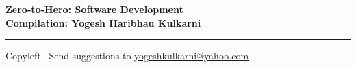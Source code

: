 
\graphicspath{{images/}}


\footnotesize


\begin{center}
\Large{\textbf{Zero-to-Hero: Software Development\\ Compilation: Yogesh Haribhau Kulkarni}}  
\end{center}

\begin{multicols}{2}

\end{multicols}

\rule{\linewidth}{0.25pt}
\scriptsize
Copyleft \textcopyleft\  Send suggestions to 
\href{http://www.yogeshkulkarni.com}{yogeshkulkarni@yahoo.com}


